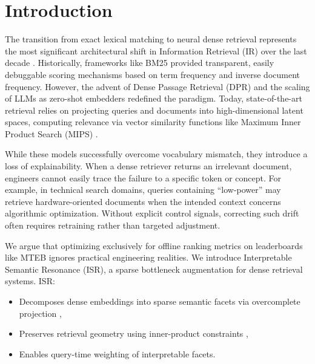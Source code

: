 \documentclass[sigconf,authordraft]{acmart}
\begin{document}


\maketitle

\section{Introduction}
The transition from exact lexical matching to neural dense retrieval represents the most significant architectural shift in Information Retrieval (IR) over the last decade \cite{lin2021}. Historically, frameworks like BM25 \cite{robertson2009} provided transparent, easily debuggable scoring mechanisms based on term frequency and inverse document frequency. However, the advent of Dense Passage Retrieval (DPR) \cite{karpukhin2020} and the scaling of LLMs \cite{bendersky2023} as zero-shot embedders redefined the paradigm. Today, state-of-the-art retrieval relies on projecting queries and documents into high-dimensional latent spaces, computing relevance via vector similarity functions like Maximum Inner Product Search (MIPS) \cite{shrivastava2014}.

While these models successfully overcome vocabulary mismatch, they introduce a loss of explainability. When a dense retriever returns an irrelevant document, engineers cannot easily trace the failure to a specific token or concept. For example, in technical search domains, queries containing “low-power” may retrieve hardware-oriented documents when the intended context concerns algorithmic optimization. Without explicit control signals, correcting such drift often requires retraining rather than targeted adjustment.

We argue that optimizing exclusively for offline ranking metrics on leaderboards like MTEB \cite{muennighoff2023} ignores practical engineering realities. We introduce Interpretable Semantic Resonance (ISR), a sparse bottleneck augmentation for dense retrieval systems. ISR:

\begin{itemize}
    \item Decomposes dense embeddings into sparse semantic facets via overcomplete projection \cite{ni2022} \cite{shrivastava2014},
    \item Preserves retrieval geometry using inner-product constraints \cite{robertson2009},
    \item Enables query-time weighting of interpretable facets.
\end{itemize}
\end{document}

